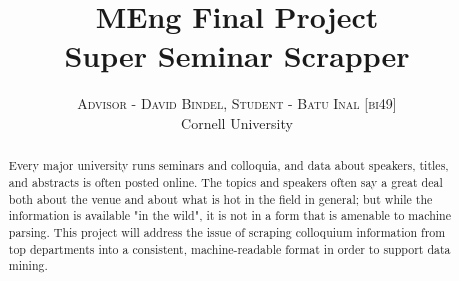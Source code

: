 \documentclass[a4paper,11pt]{article}
\title{\vspace{-15mm}\fontsize{24pt}{10pt}\selectfont\textbf{ MEng Final Project \\ \Large Super Seminar Scrapper}} %
\author{
\large
\textsc{Advisor - David Bindel, Student - Batu Inal [bi49]}\\
\normalsize Cornell University \\ %
[2mm] 
\vspace{-20mm}
}
\date{}
\begin{document}
\setlength{\textwidth}{500pt}
\maketitle %
\thispagestyle{fancy} %
\begin{abstract}
\noindent %
Every major university runs seminars and colloquia, and data about speakers, titles, and abstracts is often posted online. The topics and speakers often say a great deal both about the venue and about what is hot in the field in general; but while the information is available "in the wild", it is not in a form that is amenable to machine parsing.  This project will address the issue of scraping colloquium information from top departments into a consistent, machine-readable format in order to support data mining.\\
\end{abstract}
\end{document}
